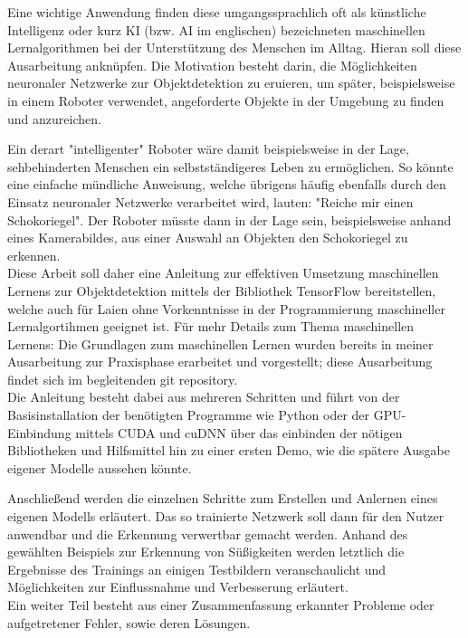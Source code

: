 \documentclass[12pt, oneside]{article}
\begin{document}
Eine wichtige Anwendung finden diese umgangssprachlich oft als künstliche Intelligenz oder kurz KI (bzw. AI im englischen) bezeichneten maschinellen Lernalgorithmen bei der Unterstützung des Menschen im Alltag. Hieran soll diese Ausarbeitung anknüpfen. Die Motivation besteht darin, die Möglichkeiten neuronaler Netzwerke zur Objektdetektion zu eruieren, um später, beispielsweise in einem Roboter verwendet, angeforderte Objekte in der Umgebung zu finden und anzureichen.

Ein derart "intelligenter" Roboter wäre damit beispielsweise in der Lage, sehbehinderten Menschen ein selbstständigeres Leben zu ermöglichen. So könnte eine einfache mündliche Anweisung, welche übrigens häufig ebenfalls durch den Einsatz neuronaler Netzwerke verarbeitet wird, lauten: "Reiche mir einen Schokoriegel". Der Roboter müsste dann in der Lage sein, beispielsweise anhand eines Kamerabildes, aus einer Auswahl an Objekten den Schokoriegel zu erkennen.\\

Diese Arbeit soll daher eine Anleitung zur effektiven Umsetzung maschinellen Lernens zur Objektdetektion mittels der Bibliothek TensorFlow bereitstellen, welche auch für Laien ohne Vorkenntnisse in der Programmierung maschineller Lernalgortihmen geeignet ist. Für mehr Details zum Thema maschinellen Lernens: Die Grundlagen zum maschinellen Lernen wurden bereits in meiner Ausarbeitung zur Praxisphase erarbeitet und vorgestellt; diese Ausarbeitung findet sich im begleitenden git repository.\\

Die Anleitung besteht dabei aus mehreren Schritten und führt von der Basisinstallation der benötigten Programme wie Python oder der GPU-Einbindung mittels CUDA und cuDNN über das einbinden der nötigen Bibliotheken und Hilfsmittel hin zu einer ersten Demo, wie die spätere Ausgabe eigener Modelle aussehen könnte.

Anschließend werden die einzelnen Schritte zum Erstellen und Anlernen eines eigenen Modells erläutert. Das so trainierte Netzwerk soll dann für den Nutzer anwendbar und die Erkennung verwertbar gemacht werden. Anhand des gewählten Beispiels zur Erkennung von Süßigkeiten werden letztlich die Ergebnisse des Trainings an einigen Testbildern veranschaulicht und Möglichkeiten zur Einflussnahme und Verbesserung erläutert.\\

Ein weiter Teil besteht aus einer Zusammenfassung erkannter Probleme oder aufgetretener Fehler, sowie deren Lösungen.
\end{document}
